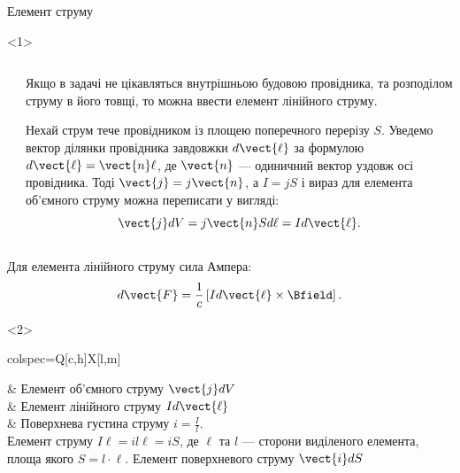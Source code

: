 \documentclass{beamer}
\begin{document}
\begin{frame}{Елемент струму}{}
	\begin{onlyenv}
		\begin{columns}
			\begin{column}{0.3\linewidth}\centering
                
			\end{column}
			\begin{column}{0.7\linewidth}
				\begin{block}{}\justifying
					Якщо в задачі не цікавляться
					внутрішньою будовою провідника, та розподілом струму в його товщі, то можна ввести \alert{елемент лінійного струму}.
				\end{block}
				\begin{block}{}\justifying\footnotesize
					Нехай струм тече провідником із площею поперечного перерізу $S$. Уведемо вектор ділянки провідника завдовжки $d\vect{\ell}$
					за формулою $d\vect{\ell} = \vect{n}\ell$, де $\vect{n}$ --- одиничний вектор уздовж осі провідника. Тоді $\vect{j} = j\vect{n}$,
					а $I = j S$ і вираз для елемента об'ємного струму можна переписати у вигляді:
					\begin{equation*}
						\vect{j}dV = j\vect{n} S d\ell  = I d\vect{\ell}.
					\end{equation*}
				\end{block}
			\end{column}
		\end{columns}
		\begin{block}{}
			Для елемента лінійного струму сила Ампера:
			\begin{equation*}
				d\vect{F} = \frac1c \left[ I d\vect{\ell} \times \Bfield\right].
			\end{equation*}
		\end{block}
	\end{onlyenv}
	\begin{onlyenv}
		\begin{tblr}{
			colspec={Q[c,h]X[l,m]}
			}
              
			 &
			Елемент об'ємного струму $\vect{j}dV$
			\\
            
			 &
			Елемент лінійного струму $Id\vect{\ell}$
			\\
            
			 &
			{
			Поверхнева густина струму $i = \frac{I}{l}$. \\
					Елемент струму $I\ell = il\ell = i S$, де $\ell$ та $l$ --- сторони виділеного елемента, площа якого $S = l\cdot \ell$.
					Елемент поверхневого струму $\vect{i}dS$
				}
		\end{tblr}
	\end{onlyenv}
\end{frame}
\end{document}
